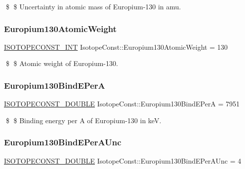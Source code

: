 \$ \$ Uncertainty in atomic mass of Europium-\/130 in amu. \mbox{\label{group___isotope_const-_europium-_eu130_ga81d646289ac377dd0cbe37bf31127a96}} 
\subsubsection{\texorpdfstring{Europium130\+Atomic\+Weight}{Europium130AtomicWeight}}
{\footnotesize\ttfamily \mbox{\hyperlink{group___isotope_const-_macros_ga5f18360b3e99483a35c32d789e62621c}{I\+S\+O\+T\+O\+P\+E\+C\+O\+N\+S\+T\+\_\+\+I\+NT}} Isotope\+Const\+::\+Europium130\+Atomic\+Weight = 130}

\$ \$ Atomic weight of Europium-\/130. \mbox{\label{group___isotope_const-_europium-_eu130_gaea002fb2baef6bb011e067c105bfe423}} 
\subsubsection{\texorpdfstring{Europium130\+Bind\+E\+PerA}{Europium130BindEPerA}}
{\footnotesize\ttfamily \mbox{\hyperlink{group___isotope_const-_macros_ga8f45a7272ce02c0b4c65c44636ed719a}{I\+S\+O\+T\+O\+P\+E\+C\+O\+N\+S\+T\+\_\+\+D\+O\+U\+B\+LE}} Isotope\+Const\+::\+Europium130\+Bind\+E\+PerA = 7951}

\$ \$ Binding energy per A of Europium-\/130 in keV. \mbox{\label{group___isotope_const-_europium-_eu130_ga0e324118394c2ca333b2b178da932fa3}} 
\subsubsection{\texorpdfstring{Europium130\+Bind\+E\+Per\+A\+Unc}{Europium130BindEPerAUnc}}
{\footnotesize\ttfamily \mbox{\hyperlink{group___isotope_const-_macros_ga8f45a7272ce02c0b4c65c44636ed719a}{I\+S\+O\+T\+O\+P\+E\+C\+O\+N\+S\+T\+\_\+\+D\+O\+U\+B\+LE}} Isotope\+Const\+::\+Europium130\+Bind\+E\+Per\+A\+Unc = 4}

